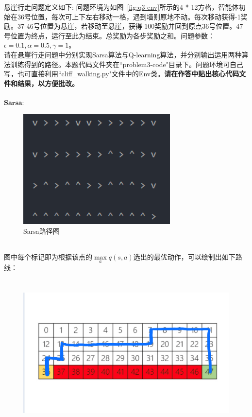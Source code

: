 \documentclass[answers]{exam}  %
\begin{document}
\begin{questions}
	悬崖行走问题定义如下: 问题环境为如图~\ref{fig:q3-env}所示的4 * 12方格，智能体初始在36号位置，每次可上下左右移动一格，遇到墙则原地不动。每次移动获得-1奖励。37-46号位置为悬崖，若移动至悬崖，获得-100奖励并回到原点36号位置。47号位置为终点，运行至此为结束。总奖励为各步奖励之和。问题参数：$\epsilon=0.1,\alpha=0.5,\gamma=1$。\\
	请在悬崖行走问题中分别实现Sarsa算法与Q-learning算法，并分别输出运用两种算法训练得到的路径。本题代码文件夹在``problem3-code"目录下。问题环境可自己写，也可直接利用``cliff\_walking.py"文件中的Env类。\textbf{请在作答中贴出核心代码文件和结果，以方便批改。}
\newpage
	~\\
	~\\
		$\textbf{Sarsa}:$\\
		\begin{figure}[h]
			\centering
			\includegraphics[width=0.7\linewidth,height=6cm]{problem3-code/sarsa.png}
			\caption{Sarsa路径图}
		\end{figure}
		~\\
		图中每个标记即为根据该点的$\max\limits_{a}q(s,a)$选出的最优动作，可以绘制出如下路线：	
		\begin{figure}[h]
			\centering
			\includegraphics[width=0.7\linewidth,height=8cm]{problem3-code/sarsa_way.png}

\end{figure}
\end{questions}
\end{document}

